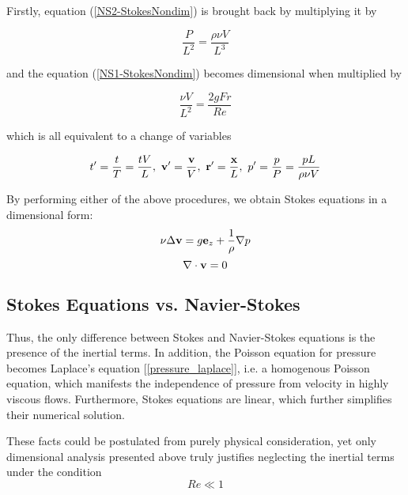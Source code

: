 Firstly, equation (\ref{NS2-StokesNondim}) is brought back by multiplying it by 

$$ \frac{P}{L^2} = \frac{\rho \nu V}{L^3}$$

and the equation (\ref{NS1-StokesNondim}) becomes dimensional when multiplied by 

$$ \frac{\nu V}{L^2} = \frac{2g Fr}{Re}$$

which is all equivalent to a change of variables 

$$ t^{\prime}  = \frac{t}{T} = \frac{tV}{L},~ \mathbf{v^{\prime}} = \frac{\mathbf{v}}{V},~ \mathbf{r^{\prime}} = \frac{\mathbf{x}}{L},~ p^{\prime} = \frac{p}{P} = \frac{pL}{\rho \nu V} $$  

By performing either of the above procedures, we obtain Stokes equations in a dimensional form:
\
\begin{equation} \label{NS1-Stokes}
\nu \Delta\mathbf{v} = g \mathbf{e}_z + \frac{1}{\rho} \nabla p 
\end{equation}
\begin{equation} \label{NS2-Stokes}
\nabla\cdot\mathbf{v} = 0
\end{equation}

\subsection{Stokes Equations vs. Navier-Stokes}

Thus, the only difference between Stokes and Navier-Stokes equations is the presence of the inertial terms. In addition, the Poisson equation for pressure becomes Laplace's equation [\ref{pressure_laplace}], i.e. a homogenous Poisson equation, which manifests the independence of pressure from velocity in highly viscous flows. Furthermore, Stokes equations are linear, which further simplifies their numerical solution.

These facts could be postulated from purely physical consideration, yet only dimensional analysis presented above truly justifies neglecting the inertial terms under the condition $$Re \ll 1 $$
